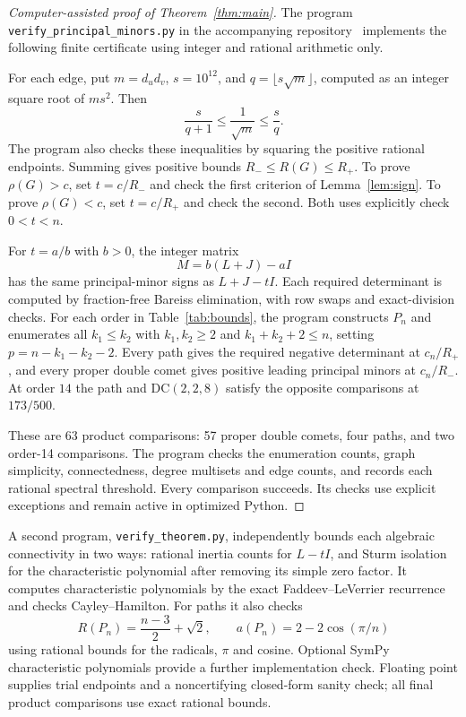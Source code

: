 \documentclass[11pt]{article}
\newcommand{\DC}{\mathrm{DC}}
\newcommand{\ra}{\rho}
\begin{document}
\begin{proof}[Computer-assisted proof of Theorem~\ref{thm:main}]
The program \texttt{verify\_principal\_minors.py} in the accompanying
repository~\cite{artifact} implements the following finite certificate
using integer and rational arithmetic only.

For each edge, put $m=d_ud_v$, $s=10^{12}$, and $q=\lfloor s\sqrt m\rfloor$,
computed as an integer square root of $ms^2$. Then
\[
 \frac{s}{q+1}\le\frac1{\sqrt m}\le\frac{s}{q}.
\]
The program also checks these inequalities by squaring the positive
rational endpoints. Summing gives positive bounds $R_-\le R(G)\le R_+$.
To prove $\ra(G)>c$, set $t=c/R_-$ and check the first criterion of
Lemma~\ref{lem:sign}. To prove $\ra(G)<c$, set $t=c/R_+$ and check the
second. Both uses explicitly check $0<t<n$.

For $t=a/b$ with $b>0$, the integer matrix
\[
 M=b(L+J)-aI
\]
has the same principal-minor signs as $L+J-tI$. Each required determinant
is computed by fraction-free Bareiss elimination, with row swaps and
exact-division checks. For each order in Table~\ref{tab:bounds}, the
program constructs $P_n$ and enumerates all $k_1\le k_2$ with
$k_1,k_2\ge2$ and $k_1+k_2+2\le n$, setting $p=n-k_1-k_2-2$.
Every path gives the required negative determinant at $c_n/R_+$, and
every proper double comet gives positive leading principal minors at
$c_n/R_-$. At order $14$ the path and $\DC(2,2,8)$ satisfy the opposite
comparisons at $173/500$.

These are 63 product comparisons: 57 proper double comets, four paths,
and two order-14 comparisons. The program checks the enumeration counts,
graph simplicity, connectedness, degree multisets and edge counts, and
records each rational spectral threshold. Every comparison succeeds.
Its checks use explicit exceptions and remain active in optimized Python.
\end{proof}

A second program, \texttt{verify\_theorem.py}, independently bounds each
algebraic connectivity in two ways: rational inertia counts for $L-tI$,
and Sturm isolation for the characteristic polynomial after removing its
simple zero factor. It computes characteristic polynomials by the exact
Faddeev--LeVerrier recurrence and checks Cayley--Hamilton. For paths it
also checks
\[
 R(P_n)=\frac{n-3}{2}+\sqrt2,\qquad
 a(P_n)=2-2\cos(\pi/n)
\]
using rational bounds for the radicals, $\pi$ and cosine. Optional SymPy
characteristic polynomials provide a further implementation check.
Floating point supplies trial endpoints and a noncertifying closed-form
sanity check; all final product comparisons use exact rational bounds.
\end{document}
